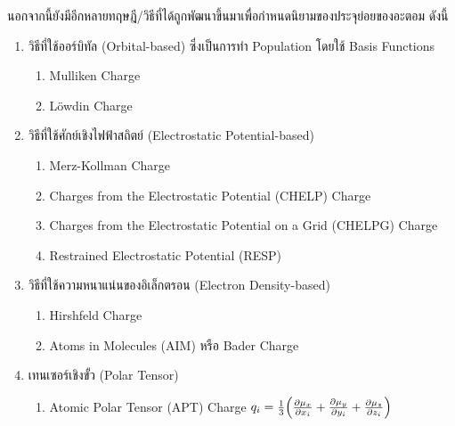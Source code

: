 นอกจากนี้ยังมีอีกหลายทฤษฎี/วิธีที่ได้ถูกพัฒนาขึ้นมาเพื่อกำหนดนิยามของประจุย่อยของอะตอม ดังนี้

\begin{enumerate}
    \item วิธีที่ใช้ออร์บิทัล (Orbital-based) ซึ่งเป็นการทำ Population โดยใช้ Basis Functions
        \begin{enumerate}
            \item Mulliken Charge\autocite{szabo1996}
            
            \item L\"{o}wdin Charge\autocite{lowdin1950}
        \end{enumerate}
    
    \item วิธีที่ใช้ศักย์เชิงไฟฟ้าสถิตย์ (Electrostatic Potential-based)
        \begin{enumerate}
            \item Merz-Kollman Charge\autocite{singh1984}
            
            \item Charges from the Electrostatic Potential (CHELP) Charge\autocite{chirlian1987}
            
            \item Charges from the Electrostatic Potential on a Grid (CHELPG) Charge\autocite{breneman1990}
            
            \item Restrained Electrostatic Potential (RESP)\autocite{cornell1993}
        \end{enumerate}
    
    \item วิธีที่ใช้ความหนาแน่นของอิเล็กตรอน (Electron Density-based)
    \begin{enumerate}
        \item Hirshfeld Charge\autocite{hirshfeld1977}
        
        \item Atoms in Molecules (AIM) หรือ Bader Charge\autocite{bader1985,bader1991}
    \end{enumerate}
    
    \item เทนเซอร์เชิงขั้ว (Polar Tensor)\autocite{person1974,milani2010}
        \begin{enumerate}
        \item Atomic Polar Tensor (APT) Charge $q_{i} = \frac{1}{3}\Big(\pdv{\mu_{x}}{x_{i}} + \pdv{\mu_{y}}{y_{i}} + \pdv{\mu_{z}}{z_{i}}\Big)$
        \end{enumerate}
\end{enumerate}

